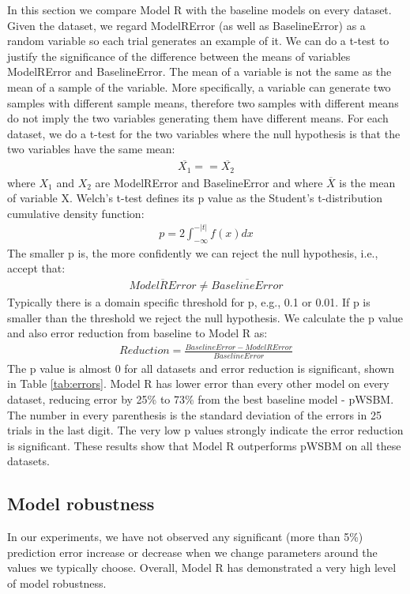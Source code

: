 \documentclass[11pt,twocolumn]{article}
\begin{document}
In this section we compare Model R with the baseline models on every dataset.
Given the dataset,
we regard ModelRError (as well as BaselineError) as a random variable
so each trial generates an example of it.
We can do a t-test to justify the significance of the difference between the means of variables ModelRError and BaselineError.
The mean of a variable is not the same as the mean of a sample of the variable.
More specifically, a variable can generate two samples with different sample means,
therefore two samples with different means do not imply the two variables generating them have different means.
For each dataset, we do a t-test for the two variables where the null hypothesis is that the two variables have the same mean:
\begin{align*}
\overline{X_1} == \overline{X_2}
\end{align*}
where $ X_1 $ and $ X_2 $ are ModelRError and BaselineError and
where $ \overline{X} $ is the mean of variable X.
Welch's t-test defines its p value as the Student's t-distribution cumulative density function:
\begin{align*}
p = 2 \int_{-\infty}^{-|t|} f(x) dx
\end{align*}
The smaller p is, the more confidently we can reject the null hypothesis, i.e., accept that:
\begin{align*}
\overline{ModelRError} \neq \overline{BaselineError}
\end{align*}
Typically there is a domain specific threshold for p, e.g., 0.1 or 0.01. If p is smaller than the threshold we reject the null hypothesis.
We calculate the p value and also error reduction from baseline to Model R as:
\begin{align*}
Reduction = \frac{BaselineError - ModelRError}{BaselineError}
\end{align*}
The p value is almost 0 for all datasets and error reduction is significant,
shown in Table \ref{tab:errors}.
Model R has lower error than every other model on every dataset,
reducing error by 25\% to 73\% from the best baseline model - pWSBM.
The number in every parenthesis is the standard deviation of the errors in 25 trials in the last digit. The very low p values strongly indicate the error reduction is significant.
These results show that Model R outperforms pWSBM on all these datasets.

\subsection{Model robustness}
In our experiments, we have not observed any significant (more than 5\%)
prediction error increase or decrease when we change parameters around the values
we typically choose.
Overall, Model R has demonstrated a very high level of model robustness.
\end{document}
